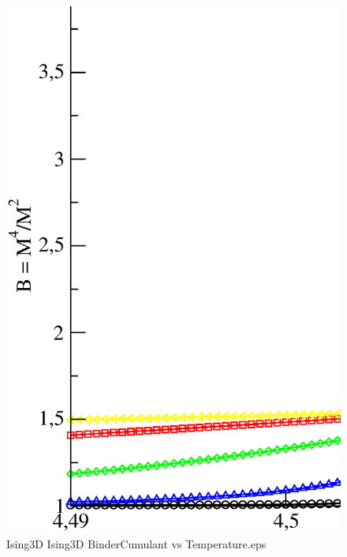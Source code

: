 \begin{figure}[!htpb]
  \centering
  \includegraphics[width=\textwidth]{./plots/Ising3D/Ising3D_BinderCumulant_vs_Temperature.eps}
  \caption{Ising3D Ising3D BinderCumulant vs Temperature.eps}
\end{figure}

